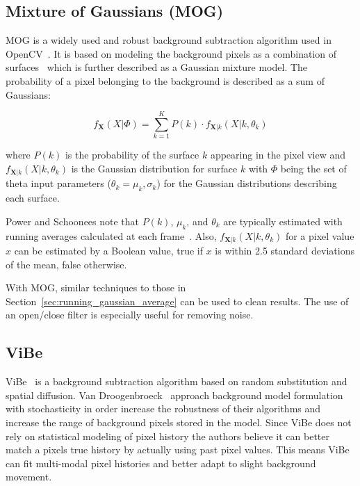 \subsection{Mixture of Gaussians (MOG)}
\label{sec:mog}
MOG is a widely used and robust background subtraction algorithm used in OpenCV~\cite{opencv_library}. It is based on modeling the background pixels as a combination of surfaces~\cite{power_2002_understanding} which is further described as a Gaussian mixture model. The probability of a pixel belonging to the background is described as a sum of Gaussians:

\begin{equation}
    f_{\textbf{X}}(X|\Phi) = \sum_{k=1}^{K} P(k) \cdot f_{\textbf{X}|k}(X|k,\theta_k)
    \label{eq:sum_of_gaussians}
\end{equation}

where $P(k)$ is the probability of the surface $k$ appearing in the pixel view and $f_{\textbf{X}|k}(X|k,\theta_k)$ is the Gaussian distribution for surface $k$ with $\Phi$ being the set of theta input parameters ($\theta_k = {\mu_k,\sigma_k}$) for the Gaussian distributions describing each surface.

Power and Schoonees note that $P(k)$, $\mu_k$, and $\theta_k$ are typically estimated with running averages calculated at each frame~\cite{power_2002_understanding}. Also, $f_{\textbf{X}|k}(X|k,\theta_k)$ for a pixel value $x$ can be estimated by a Boolean value, true if $x$ is within 2.5 standard deviations of the mean, false otherwise.

With MOG, similar techniques to those in Section~\ref{sec:running_gaussian_average} can be used to clean results. The use of an open/close filter is especially useful for removing noise.


\subsection{ViBe}
\label{sec:vibe}
ViBe~\cite{van_2014_vibe} is a background subtraction algorithm based on random substitution and spatial diffusion. Van Droogenbroeck~\etal\cite{van_2014_vibe} approach background model formulation with stochasticity in order increase the robustness of their algorithms and increase the range of background pixels stored in the model. Since ViBe does not rely on statistical modeling of pixel history the authors believe it can better match a pixels true history by actually using past pixel values. This means ViBe can fit multi-modal pixel histories and better adapt to slight background movement.

